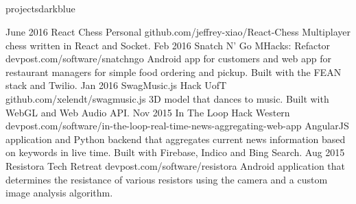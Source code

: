 \documentclass{resume}
\begin{document}
\begin{main}
		\section{\faFolder}{projects}{darkblue}
			\begin{entrylist}
				\rightentry%
					{June 2016}%
					{React Chess}%
					{Personal}%
					{github.com/jeffrey-xiao/React-Chess}%
					{Multiplayer chess written in React and Socket.}
				\rightentry%
					{Feb 2016}%
					{Snatch N' Go}%
					{MHacks: Refactor}%
					{devpost.com/software/snatchngo}%
					{Android app for customers and web app for restaurant managers for simple food ordering and pickup. Built with the FEAN stack and Twilio.}
				\rightentry%
					{Jan 2016}%
					{SwagMusic.js}%
					{Hack UofT}%
					{github.com/xelendt/swagmusic.js}%
					{3D model that dances to music. Built with WebGL and Web Audio API.}
				\rightentry%
					{Nov 2015}%
					{In The Loop}%
					{Hack Western}%
					{devpost.com/software/in-the-loop-real-time-news-aggregating-web-app}%
					{AngularJS application and Python backend that aggregates current news information based on keywords in live time. Built with Firebase, Indico and Bing Search.}
				\rightentry%
					{Aug 2015}%
					{Resistora}%
					{Tech Retreat}%
					{devpost.com/software/resistora}%
					{Android application that determines the resistance of various resistors using the camera and a custom image analysis algorithm.}
			\end{entrylist}	
	\end{main}
\end{document}
